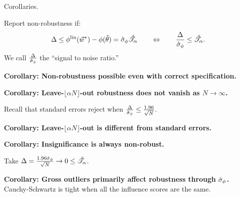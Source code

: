 
\begin{frame}{Corollaries.}


Report non-robustness if:
%
\begin{align*}
%
\Delta \le \thetafunlin(\w^*) - \thetafun(\thetahat)  = \noise \shape
\quad\quad
\Leftrightarrow
\quad\quad
\frac{\Delta}{\noise} \le \shape.
%
\end{align*}
%
We call $\frac{\Delta}{\hat\sigma_{\phi}}$ the ``signal to noise ratio.''


\hrulefill


\pause
\vspace{0.5em}
\textbf{Corollary:  Non-robustness possible even with correct specification.}

\pause
\vspace{0.5em}
\textbf{Corollary:  Leave-$\lfloor \alpha N \rfloor$-out robustness does not vanish as $N \rightarrow \infty$.}
%

\pause
\vspace{0.5em}
Recall that standard errors reject when
$\frac{\Delta}{\hat\sigma_{\phi}} \le \frac{1.96}{\sqrt{N}}$.

\pause
\vspace{0.5em}
\textbf{Corollary:  Leave-$\lfloor \alpha N \rfloor$-out is different from standard errors.}

\pause
\vspace{0.5em}
\textbf{Corollary:  Insignificance is always non-robust.}

Take $\Delta = \frac{1.96 \hat \sigma_\phi}{\sqrt{N}} \rightarrow 0 \le
\hat{\mathscr{T}}_\alpha$.

\pause
\vspace{0.5em}
\textbf{Corollary:  Gross outliers primarily affect robustness
through $\hat\sigma_{\phi}$.}
Cauchy-Schwartz is tight when all the influence scores are the same.

\end{frame}
